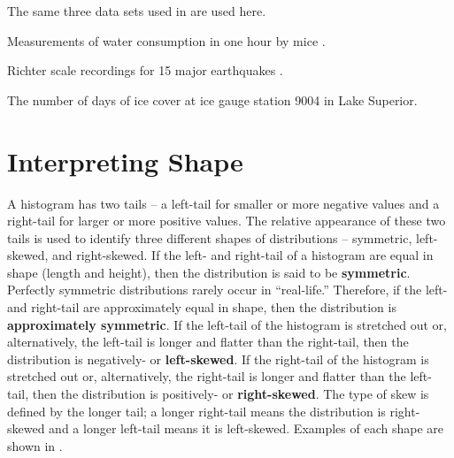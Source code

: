 \vspace{-6pt}

\vspace{-12pt}

The same three data sets used in  are used here.

\vspace{-12pt}
\begin{Itemize}
  \item Measurements of water consumption in one hour by mice .
  \item Richter scale recordings for 15 major earthquakes .
  \item The number of days of ice cover at ice gauge station 9004 in Lake Superior.
\end{Itemize}

\section{Interpreting Shape}
A histogram has two tails -- a left-tail for smaller or more negative values and a right-tail for larger or more positive values. The relative appearance of these two tails is used to identify three different shapes of distributions -- symmetric, left-skewed, and right-skewed.  If the left- and right-tail of a histogram are equal in shape (length and height), then the distribution is said to be \textbf{symmetric}. Perfectly symmetric distributions rarely occur in ``real-life.''  Therefore, if the left- and right-tail are approximately equal in shape, then the distribution is \textbf{approximately symmetric}. If the left-tail of the histogram is stretched out or, alternatively, the left-tail is longer and flatter than the right-tail, then the distribution is negatively- or \textbf{left-skewed}. If the right-tail of the histogram is stretched out or, alternatively, the right-tail is longer and flatter than the left-tail, then the distribution is positively- or \textbf{right-skewed}. The type of skew is defined by the longer tail; a longer right-tail means the distribution is right-skewed and a longer left-tail means it is left-skewed. Examples of each shape are shown in .

